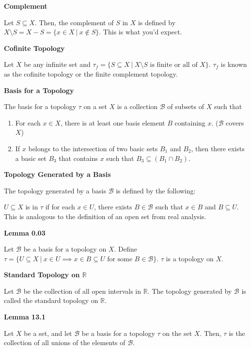 \documentclass{article}
\newcommand{\R}{\mathbb R}
\begin{document}
\medskip\noindent\textbf{Complement}

    Let $S \subseteq X$. Then, the complement of $S$ in $X$ is defined by $X \setminus S = X - S = \{x \in X~|~x \notin S\}$. This is what you'd expect.

\medskip\noindent\textbf{Cofinite Topology}

    Let $X$ be any infinite set and $\tau_f = \{S \subseteq X~|~X \setminus S \text{ is finite or all of } X\}$. $\tau_f$ is known as the cofinite topology or the finite complement topology.

\medskip\noindent\textbf{Basis for a Topology}

    The basis for a topology $\tau$ on a set $X$ is a collection $\mathcal B$ of subsets of $X$ such that
    \begin{enumerate}
        \item For each $x \in X$, there is at least one basis element $B$ containing $x$. ($\mathcal B$ covers $X$)
        \item If $x$ belongs to the intersection of two basic sets $B_1$ and $B_2$, then there exists a basic set $B_3$ that contains $x$ such that $B_3 \subseteq (B_1 \cap B_2)$.
    \end{enumerate}

\medskip\noindent\textbf{Topology Generated by a Basis}

    The topology generated by a basis $\mathcal B$ is defined by the following:

    $U \subseteq X$ is in $\tau$ if for each $x \in U$, there exists $B \in \mathcal B$ such that $x \in B$ and $B \subseteq U$. This is analogous to the definition of an open set from real analysis.

\medskip\noindent\textbf{Lemma 0.03}

    Let $\mathcal B$ be a basis for a topology on $X$. Define $\tau = \{U \subseteq X ~|~ x \in U \implies x \in B \subseteq U \text{ for some } B \in \mathcal B\}.$ $\tau$ is a topology on $X$.

\medskip\noindent\textbf{Standard Topology on $\R$}

    Let $\mathcal B$ be the collection of all open intervals in $\R$. The topology generated by $\mathcal B$ is called the standard topology on $\R$.

\medskip\noindent\textbf{Lemma 13.1}

    Let $X$ be a set, and let $\mathcal B$ be a basis for a topology $\tau$ on the set $X$. Then, $\tau$ is the collection of all unions of the elements of $\mathcal B$.
\end{document}
